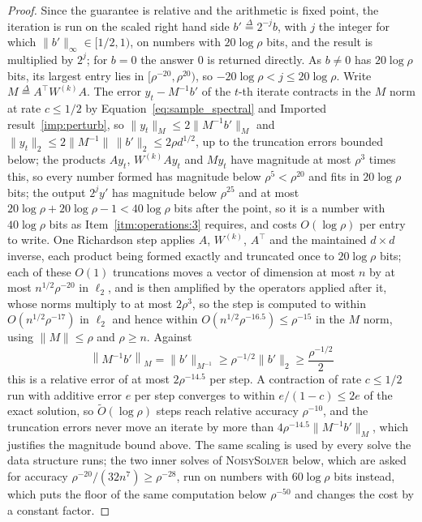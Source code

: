 \documentclass[11pt]{article}
\renewcommand{\O}{\widetilde O}
\newcommand{\defeq}{\stackrel{\Delta}{=}}
\begin{document}
\begin{proof}
Since the guarantee is relative and the arithmetic is fixed point, the iteration
is run on the scaled right hand side $b' \defeq 2^{-j} b$, with
$j$ the integer for which
$\|b'\|_{\infty} \in [1/2, 1)$, on numbers with
$20 \log \rho$ bits, and the result is multiplied by
$2^{j}$; for
$b = 0$ the answer
$0$ is returned directly.
As $b \ne 0$ has
$20 \log \rho$ bits, its largest entry lies in
$[\rho^{-20}, \rho^{20})$, so
$- 20 \log \rho < j \le 20 \log \rho$.
Write $M \defeq A^\top W^{(k)} A$.
The error $y_t - M^{-1} b'$ of the
$t$-th iterate contracts in the
$M$ norm at rate
$c \le 1/2$ by Equation~\eqref{eq:sample_spectral} and Imported
result~\ref{imp:perturb}, so $\|y_t\|_{M} \le 2 \|M^{-1} b'\|_{M}$ and
$\|y_t\|_2 \le 2 \|M^{-1}\| \, \|b'\|_2 \le 2 \rho d^{1/2}$, up to the
truncation errors bounded below; the products $A y_t$,
$W^{(k)} A y_t$ and
$M y_t$ have magnitude at most
$\rho^{3}$ times this, so every number formed has magnitude below
$\rho^{5} < \rho^{20}$ and fits in
$20 \log \rho$ bits; the output
$2^{j} y'$ has magnitude below
$\rho^{25}$ and at most
$20 \log \rho + 20 \log \rho - 1 < 40 \log \rho$ bits after the point, so it is
a number with $40 \log \rho$ bits as Item~\ref{itm:operations:3} requires, and
costs $O(\log \rho)$ per entry to write.
One Richardson step applies $A$,
$W^{(k)}$,
$A^\top$ and the maintained
$d \times d$ inverse, each product being formed exactly and truncated once to
$20 \log \rho$ bits; each of these
$O(1)$ truncations moves a vector of dimension at most
$n$ by at most
$n^{1/2} \rho^{-20}$ in
$\ell_2$, and is then amplified by the operators applied after it, whose norms
multiply to at most $2 \rho^{3}$, so the step is computed to within
$O(n^{1/2} \rho^{-17})$ in
$\ell_2$ and hence within
$O(n^{1/2} \rho^{-16.5}) \le \rho^{-15}$ in the
$M$ norm, using
$\|M\| \le \rho$ and
$\rho \ge n$.
Against
\[
\left\| M^{-1} b' \right\|_{M}
=
\|b'\|_{M^{-1}}
\ge
\rho^{-1/2} \|b'\|_2
\ge
\frac{\rho^{-1/2}}{2}
\]
this is a relative error of at most $2 \rho^{-14.5}$ per step.
A contraction of rate $c \le 1/2$ run with additive error
$e$ per step converges to within
$e / (1 - c) \le 2 e$ of the exact solution, so
$\O(\log \rho)$ steps reach relative accuracy
$\rho^{-10}$, and the truncation errors never move an iterate by more than
$4 \rho^{-14.5} \|M^{-1} b'\|_{M}$, which justifies the magnitude bound above.
The same scaling is used by every solve the data structure runs; the two inner
solves of \textsc{NoisySolver} below, which are asked for accuracy
$\rho^{-20} / (32 n^{7}) \ge \rho^{-28}$, run on numbers with
$60 \log \rho$ bits instead, which puts the floor of the same computation below
$\rho^{-50}$ and changes the cost by a constant factor.
\end{proof}
\end{document}
